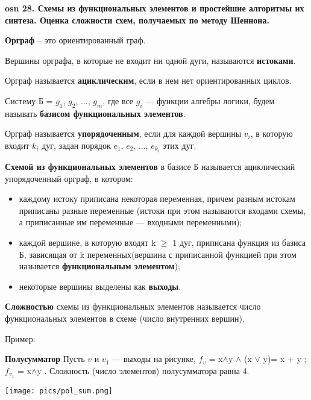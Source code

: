 \setcounter{section}{15}
\setcounter{subsection}{28}
\setcounter{equation}{0}
\textbf{\LARGE osn 28. Схемы из функциональных элементов и простейшие алгоритмы их синтеза. Оценка сложности схем, получаемых по методу Шеннона.}

\textbf{Орграф} -- это ориентированный граф.

Вершины орграфа, в которые не входит ни одной дуги, называются \textbf{истоками}.

Орграф называется \textbf{ациклическим}, если в нем нет ориентированных циклов.

Систему Б = {$g_1$, $g_2$, ..., $g_m$}, где все $g_i$ — функции алгебры логики, будем называть \textbf{базисом функциональных элементов}.

Орграф называется \textbf{упорядоченным}, если для каждой вершины $v_i$, в которую входит $k_i$ дуг, задан порядок $e_1$, $e_2$, ..., $e_{k_i}$ этих дуг.

\bigbreak

\textbf{Схемой из функциональных элементов} в базисе Б называется ациклический упорядоченный орграф, в котором:
\begin{itemize}
    \item каждому истоку приписана некоторая переменная, причем разным истокам приписаны разные переменные (истоки при этом называются входами схемы, а приписанные им переменные — входными переменными);
    \item каждой вершине, в которую входят k $\geq$ 1 дуг, приписана функция из базиса Б, зависящая от k переменных(вершина с приписанной функцией при этом называется \textbf{функциональным элементом}); 
    \item некоторые вершины выделены как \textbf{выходы}. 
\end{itemize}

\textbf{Сложностью} схемы из функциональных элементов называется число функциональных элементов в схеме (число внутренних вершин).

Пример:

\textbf{Полусумматор} Пусть $v$ и $v_1$ — выходы на рисунке, $f_v$ = x$\wedge$y $\wedge$ (x $\vee$ y)= x + y ; $f_{v_1}$ = x$\wedge$y . Сложность (число элементов) полусумматора равна 4.

\texttt{[image: pics/pol\_sum.png]}


